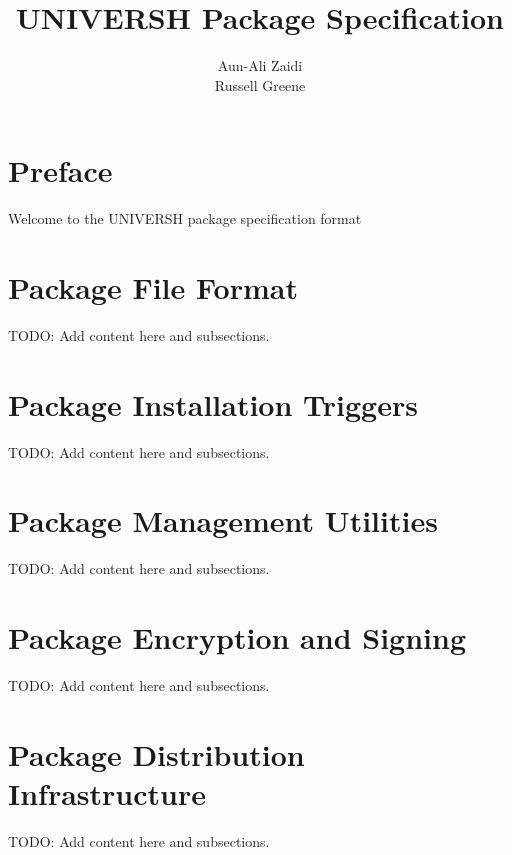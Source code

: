 \documentclass[llpt]{article}
\title{\textbf{UNIVERSH Package Specification}}
\author{Aun-Ali Zaidi\\
        Russell Greene}
\date{}
\begin{document}
\maketitle

\newpage

\tableofcontents

\newpage

\section {Preface}

Welcome to the UNIVERSH package specification format

\section {Package File Format}

TODO: Add content here and subsections.

\section {Package Installation Triggers}

TODO: Add content here and subsections.

\section {Package Management Utilities}

TODO: Add content here and subsections.

\section {Package Encryption and Signing}

TODO: Add content here and subsections.

\section {Package Distribution Infrastructure}

TODO: Add content here and subsections.
\end{document}

